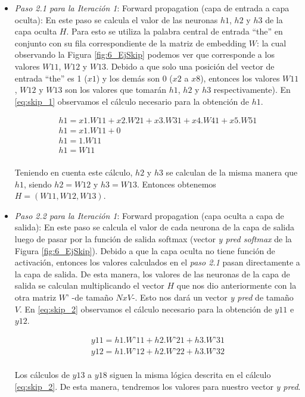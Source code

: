 \documentclass[12pt,a4paper]{article}
\begin{document}
\begin{sloppypar}
\begin{enumerate}
\begin{itemize}
\begin{itemize}
\item \textit{Paso 2.1 para la Iteración 1}: Forward propagation (capa de entrada a capa oculta): En este paso se calcula el valor de las neuronas $h1$, $h2$ y $h3$ de la capa oculta $H$. Para esto se utiliza la palabra central de entrada “the” en conjunto con su fila correspondiente de la matriz de embedding $W$: la cual observando la Figura \ref{fig:6_EjSkip} podemos ver que corresponde a los valores $W11$, $W12$ y $W13$. Debido a que solo una posición del vector de entrada “the” es 1 ($x1$) y los demás son 0 ($x2$ a $x8$), entonces los valores $W11$, $W12$ y $W13$ son los valores que tomarán $h1$, $h2$ y $h3$ respectivamente). En \ref{eq:skip_1} observamos el cálculo necesario para la obtención de $h1$.

\begin{equation}\label{eq:skip_1}
\begin{gathered}
h1 = x1 . W11 + x2 . W21 + x3 . W31 + x4 . W41 + x5 . W51 \\ 
h1 = x1 . W11 + 0 \\ 
h1 = 1 . W11 \\  
h1 = W11 
\end{gathered}
\end{equation}
\\
Teniendo en cuenta este cálculo, $h2$ y $h3$ se calculan de la misma manera que $h1$, siendo $h2 = W12$ y $h3 = W13$. Entonces obtenemos $H = (W11, W12, W13)$. \\

\item \textit{Paso 2.2 para la Iteración 1}: Forward propagation (capa oculta a capa de salida): En este paso se calcula el valor de cada neurona de la capa de salida luego de pasar por la función de salida softmax (vector \textit{y pred softmax} de la Figura \ref{fig:6_EjSkip}). Debido a que la capa oculta no tiene función de activación, entonces los valores calculados en el \textit{paso 2.1} pasan directamente a la capa de salida. De esta manera, los valores de las neuronas de la capa de salida se calculan multiplicando el vector $H$ que nos dio anteriormente con la otra matriz $W’$ -de tamaño $N x V$-. Esto nos dará un vector \textit{y pred} de tamaño $V$. En \ref{eq:skip_2} observamos el cálculo necesario para la obtención de $y11$ e $y12$.

\begin{equation}\label{eq:skip_2}
\begin{gathered}
y11 = h1 . W’11 + h2 . W’21 + h3 . W’31  \\
y12 = h1 . W’12 + h2 . W’22 + h3 . W’32
\end{gathered}
\end{equation}
\\
Los cálculos de $y13$ a $y18$ siguen la misma lógica descrita en el cálculo \ref{eq:skip_2}. De esta manera, tendremos los valores para nuestro vector \textit{y pred}.


\end{itemize}
\end{itemize}
\end{enumerate}
\end{sloppypar}
\end{document}
